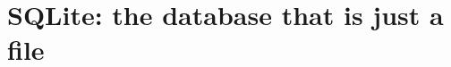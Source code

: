 \chapter{SQLite: the database that is just a file}
\label{ch:sqlite-the-database-that-is-just-a-file}

